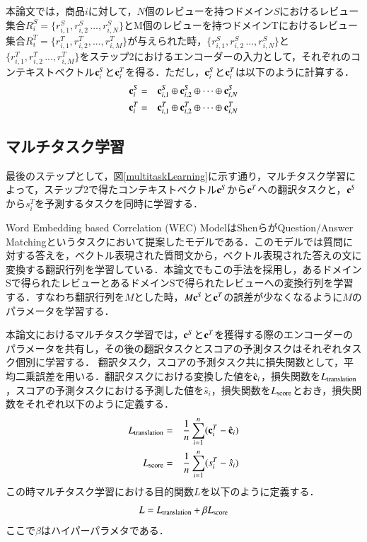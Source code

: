 \documentclass[dvipdfmx,twocolumn,10.5pt]{jsarticle}
\begin{document}
本論文では，商品$i$に対して，$N$個のレビューを持つドメイン$S$におけるレビュー集合$R^S_i = \{r^S_{i, 1}, r^S_{i, 2}\, ..., r^S_{i, N}\}$とM個のレビューを持つドメインTにおけるレビュー集合$R_i^T = \{ r^T_{i, 1}, r^T_{i, 2}, ..., r^T_{i, M}\}$が与えられた時，$\{r^S_{i, 1}, r^S_{i, 2}\, ..., r^S_{i, N}\}$と$\{r^T_{i, 1}, r^T_{i, 2}\, ..., r^T_{i, M}\}$をステップ2におけるエンコーダーの入力として，それぞれのコンテキストベクトル${\bf c}^S_i$と${\bf c}^T_i$を得る．ただし，${\bf c}^S_i$と${\bf c}^T_i$は以下のように計算する．
\begin{eqnarray}
 {\bf c}^S_i &=& {\bf c}^S_{i, 1} \oplus  {\bf c}^S_{i, 2} \oplus \cdots \oplus {\bf c}^S_{i, N} \\
  {\bf c}^T_i &=& {\bf c}^T_{i, 1} \oplus  {\bf c}^T_{i, 2} \oplus \cdots \oplus {\bf c}^T_{i, N}
\end{eqnarray}

\subsection{マルチタスク学習}\label{suggestion_create}
最後のステップとして，図\ref{multitaskLearning}に示す通り，マルチタスク学習によって，ステップ2で得たコンテキストベクトル${\bf c}^S$から$ {\bf c}^T$への翻訳タスクと，${\bf c}^S$から$s^T_i$を予測するタスクを同時に学習する．

Word Embedding based Correlation (WEC) Model\cite{shen2017word}はShenらがQuestion/Answer Matchingというタスクにおいて提案したモデルである．このモデルでは質問に対する答えを，ベクトル表現された質問文から，ベクトル表現された答えの文に変換する翻訳行列を学習している．本論文でもこの手法を採用し，あるドメインSで得られたレビューとあるドメインSで得られたレビューへの変換行列を学習する．すなわち翻訳行列を$M$とした時，$ M{\bf c}^S$と$ {\bf c}^T$の誤差が少なくなるように$M$のパラメータを学習する．
 
本論文におけるマルチタスク学習では，${\bf c}^S$と$ {\bf c}^T$を獲得する際のエンコーダーのパラメータを共有し，その後の翻訳タスクとスコアの予測タスクはそれぞれタスク個別に学習する．
翻訳タスク，スコアの予測タスク共に損失関数として，平均二乗誤差を用いる．翻訳タスクにおける変換した値を$\hat{\bf c}_i$，損失関数を$L_{\rm translation} $，スコアの予測タスクにおける予測した値を$\hat{s}_i$，損失関数を$L_{\rm score}$とおき，損失関数をそれぞれ以下のように定義する．
\begin{eqnarray}
 L_{\rm translation} &=& \frac{1}{n} \sum_{i=1}^n({\bf c}_i^T - \hat{\bf c}_i) \\
 L_{\rm score} &=& \frac{1}{n} \sum_{i=1}^n({s}_i^T - \hat{s}_i)
\end{eqnarray}
この時マルチタスク学習における目的関数$L$を以下のように定義する．
\begin{equation}
  L = L_{\rm translation} +  \beta L_{\rm score}
\end{equation}
ここで$\beta$はハイパーパラメタである．
\end{document}
